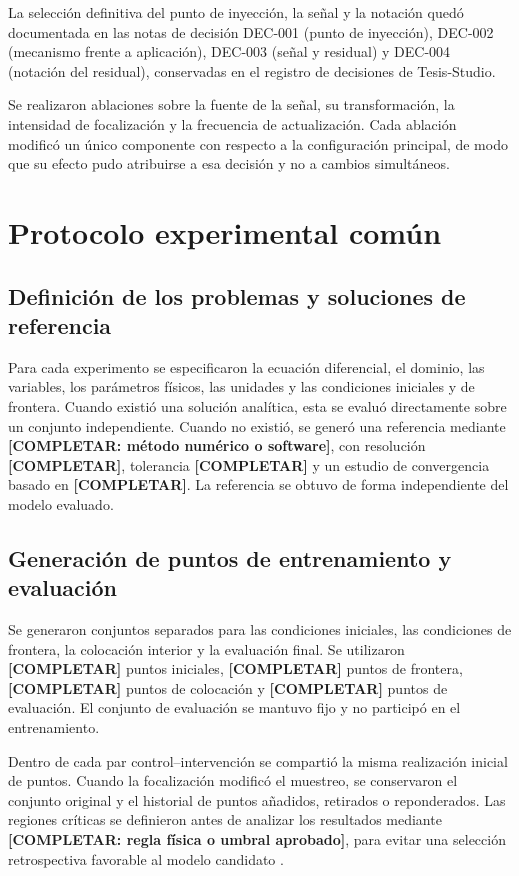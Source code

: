 La selección definitiva del punto de inyección, la señal y la notación quedó documentada en las notas de decisión DEC-001 (punto de inyección), DEC-002 (mecanismo frente a aplicación), DEC-003 (señal y residual) y DEC-004 (notación del residual), conservadas en el registro de decisiones de Tesis-Studio.

Se realizaron ablaciones sobre la fuente de la señal, su transformación, la intensidad de focalización y la frecuencia de actualización. Cada ablación modificó un único componente con respecto a la configuración principal, de modo que su efecto pudo atribuirse a esa decisión y no a cambios simultáneos.

\section{Protocolo experimental común}
\label{subsec:protocolo-comun}

\subsection{Definición de los problemas y soluciones de referencia}

Para cada experimento se especificaron la ecuación diferencial, el dominio, las variables, los parámetros físicos, las unidades y las condiciones iniciales y de frontera. Cuando existió una solución analítica, esta se evaluó directamente sobre un conjunto independiente. Cuando no existió, se generó una referencia mediante \textbf{[COMPLETAR: método numérico o software]}, con resolución \textbf{[COMPLETAR]}, tolerancia \textbf{[COMPLETAR]} y un estudio de convergencia basado en \textbf{[COMPLETAR]}. La referencia se obtuvo de forma independiente del modelo evaluado.

\subsection{Generación de puntos de entrenamiento y evaluación}

Se generaron conjuntos separados para las condiciones iniciales, las condiciones de frontera, la colocación interior y la evaluación final. Se utilizaron \textbf{[COMPLETAR]} puntos iniciales, \textbf{[COMPLETAR]} puntos de frontera, \textbf{[COMPLETAR]} puntos de colocación y \textbf{[COMPLETAR]} puntos de evaluación. El conjunto de evaluación se mantuvo fijo y no participó en el entrenamiento.

Dentro de cada par control–intervención se compartió la misma realización inicial de puntos. Cuando la focalización modificó el muestreo, se conservaron el conjunto original y el historial de puntos añadidos, retirados o reponderados. Las regiones críticas se definieron antes de analizar los resultados mediante \textbf{[COMPLETAR: regla física o umbral aprobado]}, para evitar una selección retrospectiva favorable al modelo candidato \cite{lu2021deepxde,wu2023sampling}.

